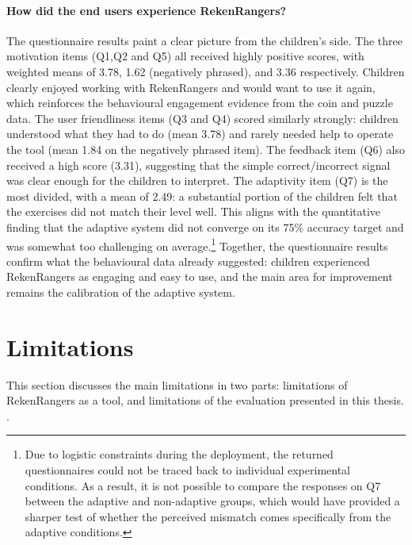 \paragraph{How did the end users experience RekenRangers?}
The questionnaire results paint a clear picture from the children's side. The three motivation items (Q1,Q2 and Q5) all received highly positive scores, with weighted means of 3.78, 1.62 (negatively phrased), and 3.36 respectively. Children clearly enjoyed working with RekenRangers and would want to use it again, which reinforces the behavioural engagement evidence from the coin and puzzle data. The user friendliness items (Q3 and Q4) scored similarly strongly: children understood what they had to do (mean 3.78) and rarely needed help to operate the tool (mean 1.84 on the negatively phrased item). The feedback item (Q6) also received a high score (3.31), suggesting that the simple correct/incorrect signal was clear enough for the children to interpret. The adaptivity item (Q7) is the most divided, with a mean of 2.49: a substantial portion of the children felt that the exercises did not match their level well. This aligns with the quantitative finding that the adaptive system did not converge on its 75\% accuracy target and was somewhat too challenging on average.\footnote{Due to logistic constraints during the deployment, the returned questionnaires could not be traced back to individual experimental conditions. As a result, it is not possible to compare the responses on Q7 between the adaptive and non-adaptive groups, which would have provided a sharper test of whether the perceived mismatch comes specifically from the adaptive conditions.} Together, the questionnaire results confirm what the behavioural data already suggested: children experienced RekenRangers as engaging and easy to use, and the main area for improvement remains the calibration of the adaptive system.

\section{Limitations}
\label{sec:limitations}
This section discusses the main limitations in two parts: limitations of RekenRangers as a tool, and limitations of the evaluation presented in this thesis.
.
